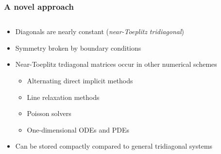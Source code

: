 \begin{frame}
\frametitle{A novel approach}
\begin{columns}
\begin{column}{0.5\textwidth}
\begin{itemize}
\item Diagonals are nearly constant (\emph{near-Toeplitz tridiagonal})
\item Symmetry broken by boundary conditions
\item Near-Toeplitz trdiagonal matrices occur in other numerical schemes
\begin{itemize}
    \item Alternating direct implicit methods
    \item Line relaxation methods
    \item Poisson solvers
    \item One-dimensional ODEs and PDEs
\end{itemize}
\item Can be stored compactly compared to general tridiagonal systems
\end{itemize}
\end{column}
\begin{column}{0.5\textwidth}
\centering
{}
\end{column}
\end{columns}
\end{frame}

